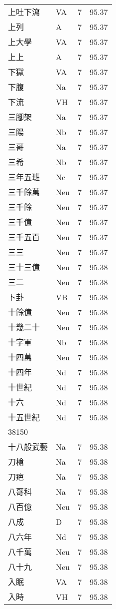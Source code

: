 \documentclass[twocolumn]{book}
\begin{document}
\begin{supertabular}{llrr}
上吐下瀉 & VA & 7 &  95.37\\
上列 & A & 7 &  95.37\\
上大學 & VA & 7 &  95.37\\
上上 & A & 7 &  95.37\\
下獄 & VA & 7 &  95.37\\
下腹 & Na & 7 &  95.37\\
下流 & VH & 7 &  95.37\\
三腳架 & Na & 7 &  95.37\\
三陽 & Nb & 7 &  95.37\\
三哥 & Na & 7 &  95.37\\
三希 & Nb & 7 &  95.37\\
三年五班 & Nc & 7 &  95.37\\
三千餘萬 & Neu & 7 &  95.37\\
三千餘 & Neu & 7 &  95.37\\
三千億 & Neu & 7 &  95.37\\
三千五百 & Neu & 7 &  95.37\\
三三 & Neu & 7 &  95.37\\
三十三億 & Neu & 7 &  95.38\\
三二 & Neu & 7 &  95.38\\
卜卦 & VB & 7 &  95.38\\
十餘億 & Neu & 7 &  95.38\\
十幾二十 & Neu & 7 &  95.38\\
十字軍 & Nb & 7 &  95.38\\
十四萬 & Neu & 7 &  95.38\\
十四年 & Nd & 7 &  95.38\\
十世紀 & Nd & 7 &  95.38\\
十六 & Nd & 7 &  95.38\\
十五世紀 & Nd & 7 &  95.38\\
38150\\
十八般武藝 & Na & 7 &  95.38\\
刀槍 & Na & 7 &  95.38\\
刀疤 & Na & 7 &  95.38\\
八哥科 & Na & 7 &  95.38\\
八百億 & Neu & 7 &  95.38\\
八成 & D & 7 &  95.38\\
八六年 & Nd & 7 &  95.38\\
八千萬 & Neu & 7 &  95.38\\
八十九 & Neu & 7 &  95.38\\
入眠 & VA & 7 &  95.38\\
入時 & VH & 7 &  95.38\\

\end{supertabular}
\end{document}
